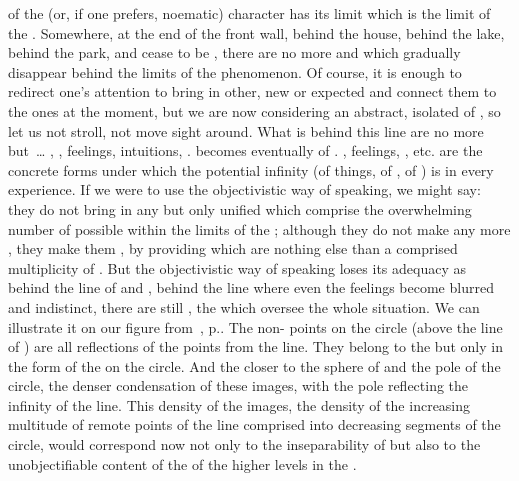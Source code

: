  of the  (or, if one prefers, noematic) character
has its limit which is the limit of the \hoa. Somewhere, at the end of the front
wall, behind the house, behind the lake, behind the park,  and
 cease to be , there are no more  and
 which gradually disappear behind the limits of the 
phenomenon. Of course, it is enough to redirect one's attention to bring in 
other, new or expected  and connect them to the ones  at
the moment, but we are now considering an abstract, isolated  of
, so let us not stroll, not move sight around.
What is  behind this line are no more  but~\ldots
{}, , feelings, intuitions, .
 becomes eventually  of .
, feelings, , etc. are the concrete forms under which
the potential infinity (of things, of , of ) is
 in every experience.  If we were to use the objectivistic 
way of speaking, we might say: they do not bring in any  but only
unified  which comprise the overwhelming number of possible
 within the limits of the \hoa; although they do not make any
more  ,
they make them , by providing  which are nothing
else than a comprised multiplicity of .  But the objectivistic way
of speaking loses its adequacy as behind the line of  and
, behind the line where even the  feelings become
blurred and indistinct, there are still , the 
which oversee the whole  situation.
We can illustrate it on our figure from~, p.\pageref{fig:levels}.
The non- points on the circle (above the line of ) are
all reflections of the  points from the line. They belong to the
 but only in the form of the  on the circle. And
the closer to the sphere of  and the pole of the circle, the
denser condensation of these images, with the pole reflecting the infinity of
the line. This density of the images, the density of the increasing multitude of
remote points of the line comprised into decreasing segments of the circle,
would correspond now not only to the inseparability of  but also
to the unobjectifiable content of the  of the higher levels 
in the . 


